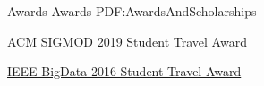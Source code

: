 
\Section
{Awards}
{Awards}
{PDF:AwardsAndScholarships}

\BulletItem
{
	ACM SIGMOD 2019 Student Travel Award}
\hfill
{}

\BulletItem
\href{http://cci.drexel.edu/bigdata/bigdata2016/StudentTravelAward.html}{
IEEE BigData 2016 Student Travel Award}
\hfill
{}